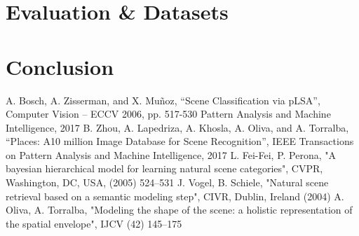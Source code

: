 \documentclass[conference]{IEEEtran}
\begin{document}
\section{Evaluation \& Datasets}


\section{Conclusion}



\begin{thebibliography}{00}
 A. Bosch, A. Zisserman, and X. Muñoz, “Scene Classification via pLSA”, Computer Vision – ECCV 2006, pp. 517-530 Pattern Analysis and Machine Intelligence, 2017
 B. Zhou, A. Lapedriza, A. Khosla, A. Oliva, and A. Torralba, “Places: A10 million Image Database for Scene Recognition”, IEEE Transactions on Pattern Analysis and Machine Intelligence, 2017
 L. Fei-Fei, P. Perona, "A bayesian hierarchical model for learning natural scene categories", CVPR, Washington, DC, USA, (2005) 524–531
 J. Vogel, B. Schiele, "Natural scene retrieval based on a semantic modeling step", CIVR, Dublin, Ireland (2004)
 A. Oliva, A. Torralba, "Modeling the shape of the scene: a holistic representation of the spatial envelope", IJCV (42) 145–175 
\end{thebibliography}
\end{document}
